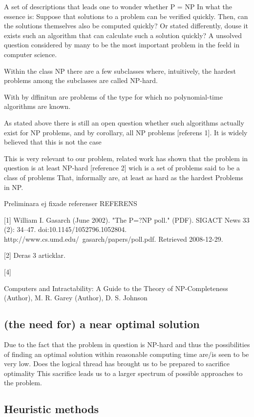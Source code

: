 A set of descriptions that leads one to wonder whether
P = NP
In what the essence is:
Suppose that solutions to a problem can be verified quickly. Then, can the solutions themselves also be computed quickly?
Or stated differently, douse it exists such an algorithm that can calculate such a solution quickly?
A unsolved question considered by many to be the most important problem in the feeld in computer science. 

Within the class NP there are a few subclasses where, intuitively, the hardest problems among the subclasses are called NP-hard.

With by dffinitun are problems of the type for which no polynomial-time algorithms are known. 

As stated above there is still an open question whether such algorithms actually exist for NP problems, and by corollary, all NP problems [referens 1]. It is widely believed that this is not the case 

This is very relevant to our problem, related work has shown that the problem in question is at least NP-hard [reference 2] wich is a set of problems said to be a class of problems That, informally are, at least as hard as the hardest Problems in NP.




Preliminara ej fixade referenser 
REFERENS 

[1]
William I. Gasarch (June 2002). "The P=?NP poll." (PDF). SIGACT News 33 (2): 34–47. doi:10.1145/1052796.1052804. http://www.cs.umd.edu/~gasarch/papers/poll.pdf. Retrieved 2008-12-29.

[2] 
Deras 3 articklar.


[4]

Computers and Intractability: A Guide to the Theory of NP-Completeness  (Author),  M. R. Garey (Author), D. S. Johnson


\subsection{(the need for) a near optimal solution}

Due to the fact that the problem in question is NP-hard and thus the possibilities of finding an optimal solution within reasonable computing time are/is seen to be very low. Does the logical thread has brought us to be prepared to sacrifice optimality
This sacrifice leads us to a larger spectrum of possible approaches to the problem.

\subsection{Heuristic methods}

